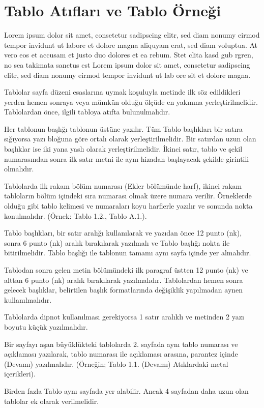 \section{Tablo Atıfları ve Tablo Örneği}
Lorem ipsum dolor sit amet, consetetur sadipscing elitr, sed diam nonumy eirmod tempor invidunt ut labore et dolore magna aliquyam erat, sed diam voluptua. At vero eos et accusam et justo duo dolores et ea rebum. Stet clita kasd gub rgren, no sea takimata sanctus est Lorem ipsum dolor sit amet, consetetur sadipscing elitr, sed diam nonumy eirmod tempor invidunt ut lab ore sit et dolore magna.

Tablolar sayfa düzeni esaslarına uymak koşuluyla metinde ilk söz edildikleri yerden hemen sonraya veya mümkün olduğu ölçüde en yakınına yerleştirilmelidir. Tablolardan önce, ilgili tabloya atıfta bulunulmalıdır.

Her tablonun başlığı tablonun üstüne yazılır. Tüm Tablo başlıkları bir satıra sığıyorsa yazı bloğuna göre ortalı olarak yerleştirilmelidir. Bir satırdan uzun olan başlıklar ise iki yana yaslı olarak yerleştirilmelidir. İkinci satır, tablo ve şekil numarasından sonra ilk satır metni ile aynı hizadan başlayacak şekilde girintili olmalıdır.

Tablolarda ilk rakam bölüm numarası (Ekler bölümünde harf), ikinci rakam tabloların  bölüm içindeki sıra numarası olmak üzere numara verilir. Örneklerde olduğu gibi tablo kelimesi ve numaraları koyu harflerle yazılır ve sonunda nokta konulmalıdır.  (Örnek: Tablo 1.2., Tablo A.1.).

Tablo başlıkları, bir satır aralığı kullanılarak ve yazıdan önce 12 punto (nk), sonra 6 punto (nk)  aralık bırakılarak yazılmalı ve Tablo başlığı nokta ile bitirilmelidir. Tablo başlığı ile tablonun tamamı aynı sayfa içinde yer almalıdır.

Tablodan sonra gelen metin bölümündeki ilk paragraf üstten 12 punto (nk) ve alttan 6 punto (nk) aralık bırakılarak yazılmalıdır. Tablolardan hemen sonra gelecek başlıklar, belirtilen başlık formatlarında değişiklik yapılmadan aynen kullanılmalıdır.

Tablolarda dipnot kullanılması gerekiyorsa 1 satır aralıklı ve metinden 2 yazı boyutu küçük yazılmalıdır.

Bir sayfayı aşan büyüklükteki tablolarda 2. sayfada aynı tablo numarası ve açıklaması yazılarak, tablo numarası ile açıklaması arasına, parantez içinde (Devamı) yazılmalıdır. (Örneğin; Tablo 1.1. (Devamı)\textbf{ }Atıklardaki metal içerikleri).

Birden fazla Tablo aynı sayfada yer alabilir. Ancak 4 sayfadan daha uzun olan tablolar ek olarak verilmelidir.

